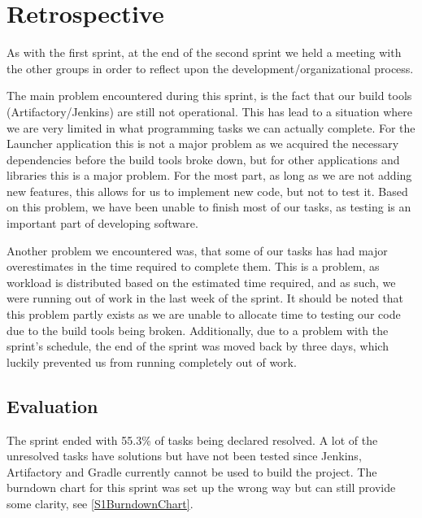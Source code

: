 \section{Retrospective}\label{S2Retro}
As with the first sprint, at the end of the second sprint we held a meeting with
the other groups in order to reflect upon the development/organizational
process.\nl

The main problem encountered during this sprint, is the fact that our build
tools (Artifactory/Jenkins) are still not operational. This has lead to a
situation where we are very limited in what programming tasks we can actually
complete. For the Launcher application this is not a major problem as we
acquired the necessary dependencies before the build tools broke down, but for
other applications and libraries this is a major problem. For the most part, as
long as we are not adding new features, this allows for us to implement new
code, but not to test it. Based on this problem, we have been unable to finish
most of our tasks, as testing is an important part of developing software.\nl

Another problem we encountered was, that some of our tasks has had major
overestimates in the time required to complete them. This is a problem, as
workload is distributed based on the estimated time required, and as such, we
were running out of work in the last week of the sprint. It should be noted that
this problem partly exists as we are unable to allocate time to testing our code
due to the build tools being broken. Additionally, due to a problem with the
sprint's schedule, the end of the sprint was moved back by three days, which
luckily prevented us from running completely out of work.

\subsection{Evaluation}
The sprint ended with 55.3\% of tasks being declared resolved. A lot of the
unresolved tasks have solutions but have not been tested since Jenkins,
Artifactory and Gradle currently cannot be used to build the project. The
burndown chart for this sprint was set up the wrong way but can still provide
some clarity, see \autoref{S1BurndownChart}.






